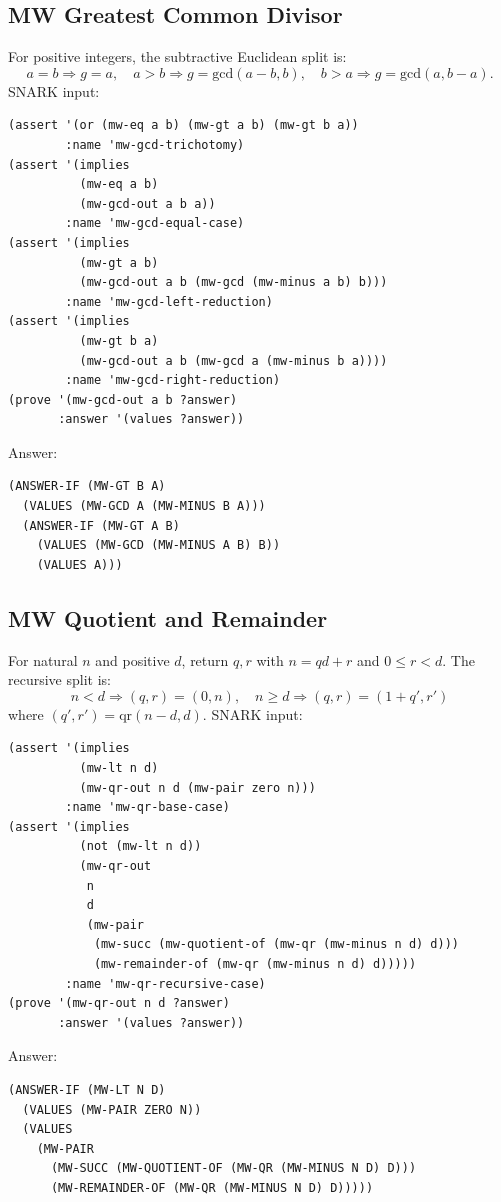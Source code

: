 \documentclass[runningheads]{llncs}
\begin{document}
\subsection{MW Greatest Common Divisor}

For positive integers, the subtractive Euclidean split is:
\[
  a=b \Rightarrow g=a,\quad
  a>b \Rightarrow g=\mathrm{gcd}(a-b,b),\quad
  b>a \Rightarrow g=\mathrm{gcd}(a,b-a).
\]
SNARK input:
\begin{lstlisting}
(assert '(or (mw-eq a b) (mw-gt a b) (mw-gt b a))
        :name 'mw-gcd-trichotomy)
(assert '(implies
          (mw-eq a b)
          (mw-gcd-out a b a))
        :name 'mw-gcd-equal-case)
(assert '(implies
          (mw-gt a b)
          (mw-gcd-out a b (mw-gcd (mw-minus a b) b)))
        :name 'mw-gcd-left-reduction)
(assert '(implies
          (mw-gt b a)
          (mw-gcd-out a b (mw-gcd a (mw-minus b a))))
        :name 'mw-gcd-right-reduction)
(prove '(mw-gcd-out a b ?answer)
       :answer '(values ?answer))
\end{lstlisting}
Answer:
\begin{lstlisting}
(ANSWER-IF (MW-GT B A)
  (VALUES (MW-GCD A (MW-MINUS B A)))
  (ANSWER-IF (MW-GT A B)
    (VALUES (MW-GCD (MW-MINUS A B) B))
    (VALUES A)))
\end{lstlisting}

\subsection{MW Quotient and Remainder}

For natural \(n\) and positive \(d\), return \(q,r\) with
\(n=qd+r\) and \(0\leq r<d\).  The recursive split is:
\[
  n<d \Rightarrow (q,r)=(0,n),\quad
  n\geq d \Rightarrow
  (q,r)=(1+q',r')
\]
where \((q',r')=\mathrm{qr}(n-d,d)\).  SNARK input:
\begin{lstlisting}
(assert '(implies
          (mw-lt n d)
          (mw-qr-out n d (mw-pair zero n)))
        :name 'mw-qr-base-case)
(assert '(implies
          (not (mw-lt n d))
          (mw-qr-out
           n
           d
           (mw-pair
            (mw-succ (mw-quotient-of (mw-qr (mw-minus n d) d)))
            (mw-remainder-of (mw-qr (mw-minus n d) d)))))
        :name 'mw-qr-recursive-case)
(prove '(mw-qr-out n d ?answer)
       :answer '(values ?answer))
\end{lstlisting}
Answer:
\begin{lstlisting}
(ANSWER-IF (MW-LT N D)
  (VALUES (MW-PAIR ZERO N))
  (VALUES
    (MW-PAIR
      (MW-SUCC (MW-QUOTIENT-OF (MW-QR (MW-MINUS N D) D)))
      (MW-REMAINDER-OF (MW-QR (MW-MINUS N D) D)))))
\end{lstlisting}
\end{document}
